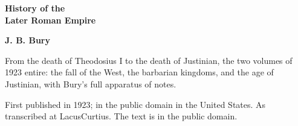 \documentclass[11pt,letterpaper]{article}
\begin{document}
\color{ink}

\begin{titlepage}
\centering
\vspace*{4em}
{\LARGE\bfseries\color{heading} History of the\\[0.3em]Later Roman Empire\par}
\vspace{2em}
{\Large\bfseries\color{heading} J. B. Bury\par}
\vspace{2.5em}
{\itshape\color{subhead}\parbox{0.8\linewidth}{\centering From the death of Theodosius I to the death of Justinian, the two volumes of 1923 entire: the fall of the West, the barbarian kingdoms, and the age of Justinian, with Bury's full apparatus of notes.\par}}
\vfill
{\small First published in 1923; in the public domain in the United States. As transcribed at LacusCurtius. The text is in the public domain.\par}
\vspace{2em}
\end{titlepage}

\tableofcontents


\end{document}
